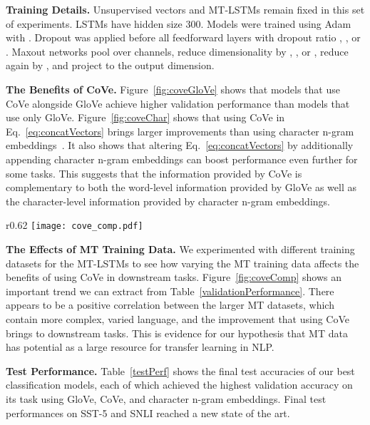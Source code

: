 \documentclass{article}
\begin{document}
\textbf{Training Details.}
Unsupervised vectors and MT-LSTMs remain fixed in this set of experiments.
LSTMs have hidden size 300.
Models were trained using Adam with . 
Dropout was applied before all feedforward layers with dropout ratio , , or .
Maxout networks pool over  channels, reduce dimensionality by , , or , reduce again by , and project to the output dimension.

\textbf{The Benefits of CoVe.}
Figure~\ref{fig:coveGloVe} shows that models that use CoVe alongside GloVe achieve higher validation performance than models that use only GloVe.
Figure~\ref{fig:coveChar} shows that using CoVe in Eq.~\ref{eq:concatVectors} brings larger improvements than using character n-gram embeddings~\citep{Hashimoto2016AJM}. It also shows that altering Eq.~\ref{eq:concatVectors} by additionally appending character n-gram embeddings can boost performance even further for some tasks.
This suggests that the information provided by CoVe is complementary to both the word-level information provided by GloVe as well as the character-level information provided by character n-gram embeddings.


\begin{wrapfigure}[16]{r}{0.62\textwidth}
\vspace{-5.5mm}
  \centering
  \texttt{[image: cove\_comp.pdf]}
  \caption{The Effects of MT Training Data
  }
\label{fig:coveComp}
\end{wrapfigure}

\textbf{The Effects of MT Training Data.}
We experimented with different training datasets for the MT-LSTMs to see how varying the MT training data affects the benefits of using CoVe in downstream tasks.
Figure~\ref{fig:coveComp} shows an important trend we can extract from Table~\ref{validationPerformance}. 
There appears to be a positive correlation between the larger MT datasets,
which contain more complex, varied language, 
and the improvement that using CoVe brings to downstream tasks.
This is evidence for our hypothesis that MT data has potential as a large resource for transfer learning in NLP.

\textbf{Test Performance.} 
Table~\ref{testPerf} shows the final test accuracies of our best classification models, 
each of which achieved the highest validation accuracy on its task using GloVe, CoVe, and character n-gram embeddings.
Final test performances on SST-5 and SNLI reached a new state of the art.
\end{document}
